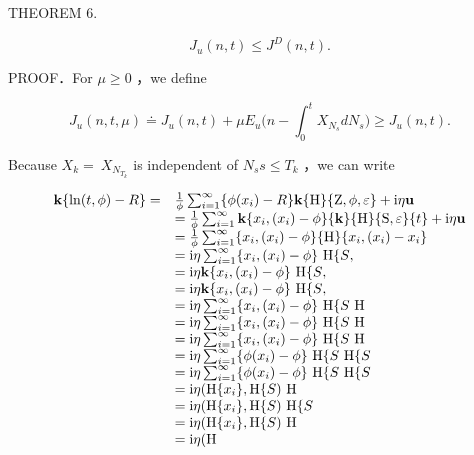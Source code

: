THEOREM 6.

\[
J _ { u } ( n , t ) \le J ^ { D } ( n , t ) .
\]

PROOF．For \(\mu \geq 0\) ，we define

\[
J _ { u } ( n , t , \mu ) \doteq J _ { u } ( n , t ) + \mu E _ { u } \bigg ( n - \int _ { 0 } ^ { t } { X _ { N _ { s } } d N _ { s } } \bigg ) \ge J _ { u } ( n , t ) .
\]

Because \(X _ { k } = \ X _ { N _ { T _ { k } } }\) is independent of
\(N _ { s } s \le T _ { k }\) ，we can write

\[
\begin{array} { r l } { \mathbf { k } \{ \ln ( t , \phi ) - R \} = } & { \frac { 1 } { \phi } \sum _ { i = 1 } ^ { \infty } \{ \phi ( x _ { i } ) - R \} \mathbf { k } \{ \mathrm { H } \} \{ \mathrm { Z } , \phi , \varepsilon \} + \mathrm { i } \eta \mathbf { u } } \\ & { = \frac { 1 } { \phi } \sum _ { i = 1 } ^ { \infty } \mathbf { k } \{ x _ { i } , ( x _ { i } ) - \phi \} \{ \mathbf { k } \} \{ \mathrm { H } \} \{ \mathrm { S } , \varepsilon \} \{ t \} + \mathrm { i } \eta \mathbf { u } } \\ & { = \frac { 1 } { \phi } \sum _ { i = 1 } ^ { \infty } \{ x _ { i } , ( x _ { i } ) - \phi \} \{ \mathrm { H } \} \{ x _ { i } , ( x _ { i } ) - x _ { i } \} } \\ & { = \mathrm { i } \eta \sum _ { i = 1 } ^ { \infty } \{ x _ { i } , ( x _ { i } ) - \phi \} \ \mathrm { H } \{ S } ,  \\ & { = \mathrm { i } \eta \mathbf { k } \{ x _ { i } , ( x _ { i } ) - \phi \} \ \mathrm { H } \{ S } ,  \\ & { = \mathrm { i } \eta \mathbf { k } \{ x _ { i } , ( x _ { i } ) - \phi \} \ \mathrm { H } \{ S } ,  \\ & { = \mathrm { i } \eta \sum _ { i = 1 } ^ { \infty } \{ x _ { i } , ( x _ { i } ) - \phi \} \ \mathrm { H } \{ S } \ \mathrm { H } \  \\ & { = \mathrm { i } \eta \sum _ { i = 1 } ^ { \infty } \{ x _ { i } , ( x _ { i } ) - \phi \} \ \mathrm { H } \{ S } \ \mathrm { H } \  \\ & { = \mathrm { i } \eta \sum _ { i = 1 } ^ { \infty } \{ x _ { i } , ( x _ { i } ) - \phi \} \ \mathrm { H } \{ S } \ \mathrm { H } \  \\ & { = \mathrm { i } \eta \sum _ { i = 1 } ^ { \infty } \{ \phi ( x _ { i } ) - \phi \} \ \mathrm { H } \{ S } \ \mathrm { H } \{ S  \  \\ & { = \mathrm { i } \eta \sum _ { i = 1 } ^ { \infty } \{ \phi ( x _ { i } ) - \phi \} \ \mathrm { H } \{ S } \ \mathrm { H } \{ S  \  \\ & { = \mathrm { i } \eta ( \mathrm { H } \{ x _ { i } \} , \mathrm { H } \{ S } ) \ \mathrm { H } \  \\ & { = \mathrm { i } \eta ( \mathrm { H } \{ x _ { i } \} , \mathrm { H } \{ S } ) \ \mathrm { H } \{ S  \  \\ & { = \mathrm { i } \eta ( \mathrm { H } \{ x _ { i } \} , \mathrm { H } \{ S } ) \ \mathrm { H } \  \\ &  = \mathrm { i } \eta ( \mathrm { H } \end{array}
\]

